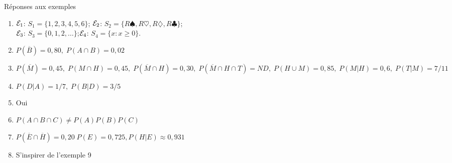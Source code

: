 \documentclass{BeamerTemplate}
\begin{document}
\begin{frame}[t]{Réponses aux exemples}

\footnotesize
\begin{enumerate}
  \item ${\cal{E}}_1$:  $ {{S}}_1=\{1,2,3,4,5,6\}$;  ${\cal{E}}_2$: $  {{S}}_2=\{R\spadesuit,R\heartsuit,R\diamondsuit,R\clubsuit\}$;\\${\cal{E}}_3$: $ {{S}}_3=\{0,1,2,\ldots\}$;${\cal{E}}_4$: $ {{S}}_4=\{x:x\ge0\}$.
  \item $P(\overline B)= 0,80,\; P(A\cap B)=0,02$
  \item $P(\overline M)=0,45,\;P(M\cap H)=0,45,\;P(\overline M\cap H)=0,30, \; P(\overline M\cap H\cap T)=ND,\;P(H\cup M)=0,85,\;P(M|H)=0,6,\;P(T|M)=7/11$
  \item $P(D|A)=1/7,\; P(B|D)=3/5$
  \item Oui
  \item $P(A\cap B\cap C)\ne P(A)P(B)P(C)$
  \item $P(\overline E\cap \overline H)=0,20\; P(E)=0,725, P(H|E)\approx 0,931$
  \item S'inspirer de l'exemple 9
 \end{enumerate}
\end{frame}
\end{document}
